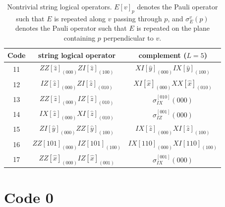 \documentclass[letterpaper,10pt,pra,aps,showpacs,twocolumn]{revtex4-1}
\theoremstyle{definition} \newtheorem{defn}{Definition}
\theoremstyle{definition} \newtheorem{remark}{Remark}
\begin{document}
\begin{table}
\begin{tabular}{c|c|c}
\hline
Code & string logical operator & complement ($L=5$) \\
\hline
11 & $ZZ[\hat{z}]_{(000)} ZI[\hat{z}]_{(100)}$ & $XI[\hat{y}]_{(000)} IX[\hat{y}]_{(100)}$ \\
12 & $IZ[\hat{z}]_{(000)} ZI[\hat{z}]_{(010)}$ & $XI[\hat{x}]_{(000)} XX[\hat{x}]_{(010)}$ \\
13 & $ZZ[\hat{z}]_{(000)} IZ[\hat{z}]_{(010)}$ & $\sigma^{[010]}_{IX}(000)$ \\
14 & $IX[\hat{z}]_{(000)} XI[\hat{z}]_{(010)}$ & $\sigma^{[001]}_{IZ}(000)$ \\
15 & $ZI[\hat{y}]_{(000)} ZZ[\hat{y}]_{(100)}$ & $IX[\hat{z}]_{(000)} XI[\hat{z}]_{(100)}$ \\
16 & $ZZ[101]_{(000)} IZ[101]_{(100)}$         & $IX[110]_{(000)} XI[110]_{(100)}$ \\
17 & $ZZ[\hat{x}]_{(000)} IZ[\hat{x}]_{(001)}$ & $ \sigma^{[001]}_{IX}(000)$ \\
\hline
\end{tabular}
\caption{Nontrivial string logical operators. $E[v]_p$ denotes the Pauli operator such that $E$ is repeated along $v$ passing through $p$, and $\sigma^v_E(p)$ denotes the Pauli operator such that $E$ is repeated on the plane containing $p$ perpendicular to $v$.}
\label{tb:string_logical_operators}
\end{table}

\section{Code 0}
\label{section:code0}
\end{document}
